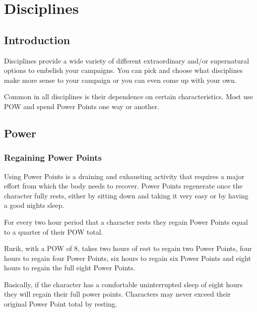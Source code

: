 \chapter{Disciplines}
\label{ch:disciplines}

\section{Introduction}
Disciplines provide a wide variety of different extraordinary and/or supernatural options to embelish your campaigns. You can pick and choose what disciplines make more sense to your campaign or you can even come up with your own.

Common in all disciplines is their dependence on certain characteristics. Most use POW and spend Power Points one way or another.

\section{Power}

\subsection{Regaining Power Points}
Using Power Points is a draining and exhausting activity that requires a major effort from which the body needs to recover. Power Points regenerate once the character fully rests, either by sitting down and taking it very easy or by having a good nights sleep. 

For every two hour period that a character rests they regain Power Points equal to a quarter of their POW total.  

\vspace{1em}

\begin{rpg-examplebox}
Rurik, with a POW of 8, takes two hours of rest to regain two Power Points, four hours to regain four Power Points, six hours to regain six Power Points and eight hours to regain the full eight Power Points. 
\end{rpg-examplebox}

\vspace{1em}

Basically, if the character has a comfortable uninterrupted sleep of eight hours they will regain their full power points. Characters may never exceed their original Power Point total by resting.

\vspace{1em}

